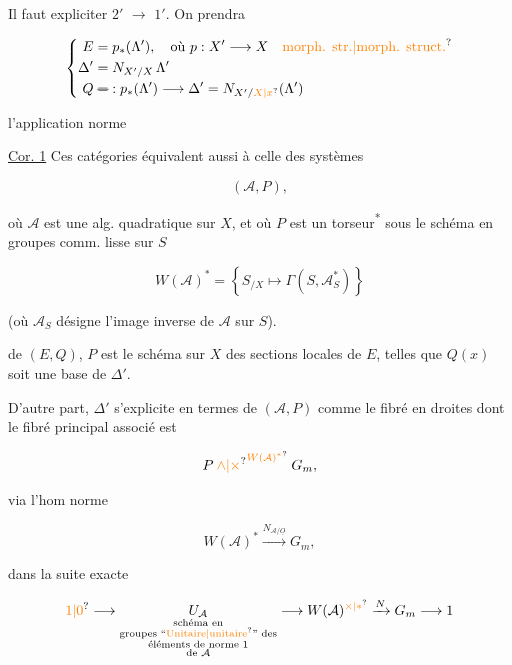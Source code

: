Il faut expliciter \textcircled{$2'$} $\longrightarrow$ \textcircled{$1'$}. On prendra

\[
\left\{\begin{aligned}
 E&=p_*(\Lambda'),\quad\text{où }p:X'\longrightarrow X\quad\text{\unsure{morph. str.|morph. struct.}}\\
 \Delta'&=N_{X'/X}\,\Lambda'\\
 Q&\mathrel{\deleted{=}:}p_*(\Lambda')\longrightarrow\Delta'=N_{X'/\unsure{X|x}}(\Lambda')
\end{aligned}\right.
\]

l'application norme

\uline{Cor. 1} Ces catégories équivalent aussi à celle  des systèmes

\[
(\mathcal A,P),
\]

où $\mathcal A$ est une alg. quadratique sur $X$, et où $P$ est un torseur\textsuperscript{*} sous le schéma en groupes comm. lisse  sur $S$


\[
W(\mathcal A)^*=\left\{S_{/X}\longmapsto\Gamma(S,\mathcal A_S^*)\right\}
\]

(où $\mathcal A_S$ désigne l'image inverse de $\mathcal A$ sur $S$).

 de $(E,Q)$, $P$ est le schéma sur $X$ des sections locales de $E$, telles que $Q(x)$ soit une base de $\Delta'$.

D'autre part, $\Delta'$ s'explicite en termes de $(\mathcal A,P)$ comme le fibré en droites dont le fibré principal associé est

\[
P\mathbin{\unsure{\wedge|\times}}^{\unsure{W(\mathcal A)^*}}G_m,
\]

via l'hom norme

\[
W(\mathcal A)^*\xrightarrow{N_{\mathcal A/\underline O}}G_m,
\]

 dans la suite exacte

\[
\unsure{1|0}\longrightarrow\underset{\substack{\text{schéma en}\\\text{groupes }\text{``\unsure{Unitaire|unitaire}''}\text{ des}\\\text{éléments de norme }1\\\text{de }\mathcal A}}{U_{\mathcal A}}\longrightarrow W(\mathcal A)^{\unsure{\times|*}}\xrightarrow{N}G_m\longrightarrow1
\]

